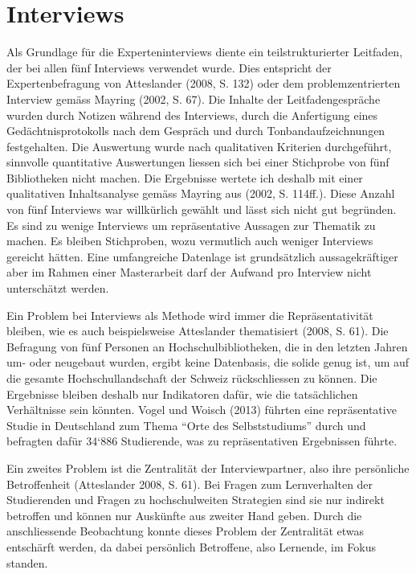\documentclass[a4paper,
fontsize=11pt,
oneside,
numbers=noperiodatend,
parskip=half-,
bibliography=totoc,
final
]{scrartcl}
\begin{document}
\section*{Interviews}\label{interviews}

Als Grundlage für die Experteninterviews diente ein teilstrukturierter
Leitfaden, der bei allen fünf Interviews verwendet wurde. Dies
entspricht der Expertenbefragung von Atteslander (2008, S. 132) oder dem
problemzentrierten Interview gemäss Mayring (2002, S. 67). Die Inhalte
der Leitfadengespräche wurden durch Notizen während des Interviews,
durch die Anfertigung eines Gedächtnisprotokolls nach dem Gespräch und
durch Tonbandaufzeichnungen festgehalten. Die Auswertung wurde nach
qualitativen Kriterien durchgeführt, sinnvolle quantitative Auswertungen
liessen sich bei einer Stichprobe von fünf Bibliotheken nicht machen.
Die Ergebnisse wertete ich deshalb mit einer qualitativen Inhaltsanalyse
gemäss Mayring aus (2002, S. 114ff.). Diese Anzahl von fünf Interviews
war willkürlich gewählt und lässt sich nicht gut begründen. Es sind zu
wenige Interviews um repräsentative Aussagen zur Thematik zu machen. Es
bleiben Stichproben, wozu vermutlich auch weniger Interviews gereicht
hätten. Eine umfangreiche Datenlage ist grundsätzlich aussagekräftiger
aber im Rahmen einer Masterarbeit darf der Aufwand pro Interview nicht
unterschätzt werden.

Ein Problem bei Interviews als Methode wird immer die Repräsentativität
bleiben, wie es auch beispielsweise Atteslander thematisiert (2008, S.
61). Die Befragung von fünf Personen an Hochschulbibliotheken, die in
den letzten Jahren um- oder neugebaut wurden, ergibt keine Datenbasis,
die solide genug ist, um auf die gesamte Hochschullandschaft der Schweiz
rückschliessen zu können. Die Ergebnisse bleiben deshalb nur Indikatoren
dafür, wie die tatsächlichen Verhältnisse sein könnten. Vogel und Woisch
(2013) führten eine repräsentative Studie in Deutschland zum Thema
\enquote{Orte des Selbststudiums} durch und befragten dafür 34`886
Studierende, was zu repräsentativen Ergebnissen führte.

Ein zweites Problem ist die Zentralität der Interviewpartner, also ihre
persönliche Betroffenheit (Atteslander 2008, S. 61). Bei Fragen zum
Lernverhalten der Studierenden und Fragen zu hochschulweiten Strategien
sind sie nur indirekt betroffen und können nur Auskünfte aus zweiter
Hand geben. Durch die anschliessende Beobachtung konnte dieses Problem
der Zentralität etwas entschärft werden, da dabei persönlich Betroffene,
also Lernende, im Fokus standen.
\end{document}
